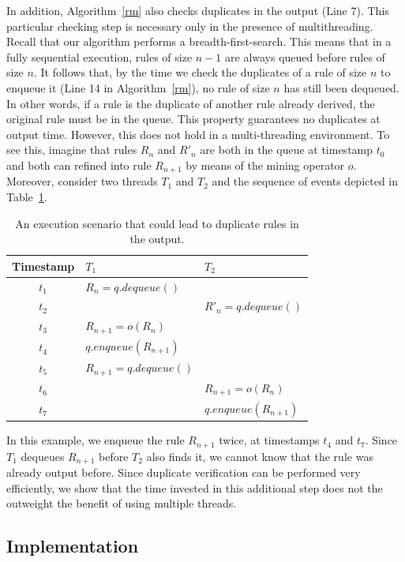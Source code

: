 {In addition, Algorithm~\ref{rm} also checks duplicates in the output (Line 7). This particular checking step 
is necessary only in the presence of multithreading. Recall that our algorithm performs a breadth-first-search. 
This means that in a fully sequential execution, rules of size $n-1$ are always queued before rules of size $n$. 
It follows that, by the time we check the duplicates of a rule of size $n$ to enqueue it (Line 14 in Algorithm~\ref{rm}), 
no rule of size $n$ has still been dequeued. In other words, if a rule is the duplicate 
of another rule already derived, the original rule must be in the queue. This property guarantees no duplicates at output time. 
However, this does not hold in a multi-threading environment. To see this, imagine that rules 
$R_n$ and $R'_n$ are both in the queue at timestamp $t_0$ and both can refined into rule $R_{n+1}$
by means of the mining operator $o$. 
Moreover, consider two threads $T_1$ and $T_2$ and the sequence of events depicted in Table~\ref{tab:duplicates}.

\begin{table}
\centering
 \begin{tabular}{c|l|l}
  Timestamp & $T_1$ & $T_2$\\  \hline
  $t_1$ & $R_n = q.dequeue()$	&  \\
  $t_2$ & & $R'_n = q.dequeue()$ \\
  $t_3$ & $R_{n+1} = o(R_n)$  & \\
  $t_4$ & $q.enqueue(R_{n+1})$  & \\
  $t_5$ & $R_{n+1} = q.dequeue()$ & \\
  $t_6$ & & $R_{n+1} = o(R_n)$ \\
  $t_7$ & & $q.enqueue(R_{n+1})$ \\
\end{tabular}
\caption{An execution scenario that could lead to duplicate rules in the output.}\label{tab:duplicates}
\end{table}

In this example, we enqueue the rule $R_{n+1}$ twice, at timestamps $t_4$ and $t_7$. 
Since $T_1$ dequeues $R_{n+1}$ before $T_2$ also finds it, 
we cannot know that the rule was already output before. Since duplicate verification
can be performed very efficiently, we show that the time invested in this additional step does not the 
outweight the benefit of using multiple threads.


\subsection{Implementation} \label{subsec:implementation}

}
